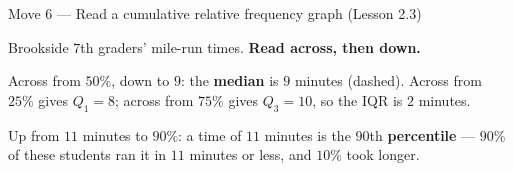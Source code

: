 \documentclass[10pt]{article}
\begin{document}
\vspace{3pt}
\boxguard[24]
\begin{notesbox}{Move 6 --- Read a cumulative relative frequency graph (Lesson 2.3)}
\small
\begin{minipage}[t]{0.52\linewidth}
\vspace{0pt}
\end{minipage}\hfill
\begin{minipage}[t]{0.45\linewidth}
\vspace{2pt}
Brookside $7$th graders' mile-run times. \textbf{Read across, then down.}

\vspace{3pt}
Across from $50\%$, down to $9$: the \textbf{median} is $9$ minutes (dashed). Across from
$25\%$ gives $Q_1 = 8$; across from $75\%$ gives $Q_3 = 10$, so the IQR is $2$ minutes.

\vspace{3pt}
Up from $11$ minutes to $90\%$: a time of $11$ minutes is the $90$th \textbf{percentile} ---
$90\%$ of these students ran it in $11$ minutes or less, and $10\%$ took longer.
\end{minipage}
\end{notesbox}
\end{document}
